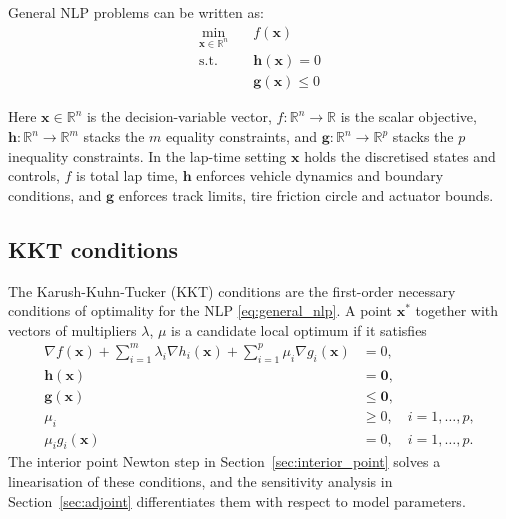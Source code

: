 General NLP problems can be written as:
\begin{equation}
    \begin{aligned}
        \min_{\mathbf{x} \in \mathbb{R}^n} \quad & f(\mathbf{x})                 \\
        \text{s.t.} \quad                        & \mathbf{h}(\mathbf{x}) = 0    \\
                                                 & \mathbf{g}(\mathbf{x}) \leq 0
    \end{aligned}
    \label{eq:general_nlp}
\end{equation}

Here $\mathbf{x} \in \mathbb{R}^n$ is the decision-variable vector, $f : \mathbb{R}^n \to \mathbb{R}$ is the scalar objective, $\mathbf{h} : \mathbb{R}^n \to \mathbb{R}^m$ stacks the $m$ equality constraints, and $\mathbf{g} : \mathbb{R}^n \to \mathbb{R}^p$ stacks the $p$ inequality constraints. In the lap-time setting $\mathbf{x}$ holds the discretised states and controls, $f$ is total lap time, $\mathbf{h}$ enforces vehicle dynamics and boundary conditions, and $\mathbf{g}$ enforces track limits, tire friction circle and actuator bounds.



\subsection{KKT conditions}
\label{subsec:kkt}
The Karush-Kuhn-Tucker (KKT) conditions are the first-order necessary conditions of optimality for the NLP \eqref{eq:general_nlp}. A point $\mathbf{x}^*$ together with vectors of multipliers $\lambda$, $\mu$ is a candidate local optimum if it satisfies
\begin{equation}
    \begin{aligned}
        \nabla f(\mathbf{x}) + \sum_{i=1}^{m} \lambda_i \nabla h_i(\mathbf{x}) + \sum_{i=1}^{p} \mu_i \nabla g_i(\mathbf{x}) & = 0                           , \\
        \mathbf{h}(\mathbf{x})                                                                                               & = \mathbf{0}                  , \\
        \mathbf{g}(\mathbf{x})                                                                                               & \leq \mathbf{0}                ,\\
        \mu_i                                                                                                                & \geq 0, \quad i = 1, \ldots, p ,\\
        \mu_i g_i(\mathbf{x})                                                                                                & = 0, \quad i = 1, \ldots, p.
    \end{aligned}
    \label{eq:kkt}
\end{equation}
The interior point Newton step in Section~\ref{sec:interior_point} solves a linearisation of these conditions, and the sensitivity analysis in Section~\ref{sec:adjoint} differentiates them with respect to model parameters.


